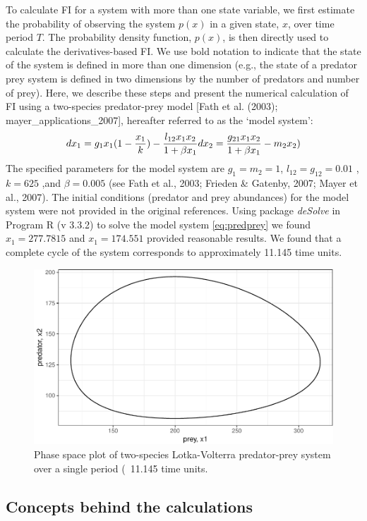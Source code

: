 \documentclass[12pt,twoside,openany]{reedthesis}
\begin{document}
To calculate FI for a system with more than one state variable, we first estimate the probability of observing the system \(p(x)\) in a given state, \(x\), over time period \(T\). The probability density function, \(p(x)\), is then directly used to calculate the derivatives-based FI. We use bold notation to indicate that the state of the system is defined in more than one dimension (e.g., the state of a predator prey system is defined in two dimensions by the number of predators and number of prey). Here, we describe these steps and present the numerical calculation of FI using a two-species predator-prey model {[}Fath et al. (2003); mayer\_applications\_2007{]}, hereafter referred to as the `model system':
\begin{equation} 
  dx_1 = g_{1}x_{1}(1-\frac{x_1}{k})- \frac{l_{12} x_{1} x_{2}}{1+\beta x_{1}} \\
  dx_2 = \frac{g_{21}x_1 x_2}{1+\beta x_1} - m_2 x_2)
  \label{eq:predprey}
\end{equation}
The specified parameters for the model system are \(g_1=m_2=1\), \(l_12=g_12 = 0.01\) , \(k=625\) ,and \(\beta=0.005\) (see Fath et al., 2003; Frieden \& Gatenby, 2007; Mayer et al., 2007). The initial conditions (predator and prey abundances) for the model system were not provided in the original references. Using package \emph{deSolve} in Program R (v 3.3.2) to solve the model system \eqref{eq:predprey} we found \(x_1 = 277.7815\) and \(x_1= 174.551\) provided reasonable results. We found that a complete cycle of the system corresponds to approximately 11.145 time units.
\begin{figure}

{\centering \includegraphics[width=0.85\linewidth]{_myDissertation_files/figure-latex/pp1Period-1} 

}

\caption{Phase space plot of two-species Lotka-Volterra predator-prey system over a single period (~11.145 time units.}\label{fig:pp1Period}
\end{figure}
\hypertarget{concepts-behind-the-calculations}{%
\subsection{Concepts behind the calculations}\label{concepts-behind-the-calculations}}
\end{document}
